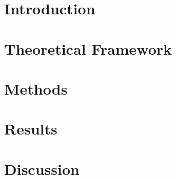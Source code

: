 \documentclass[a4paper,11pt]{article}
\begin{document}
\section{Introduction}

\section{Theoretical Framework}

\section{Methods}

\section{Results}

\section{Discussion}
\end{document}
